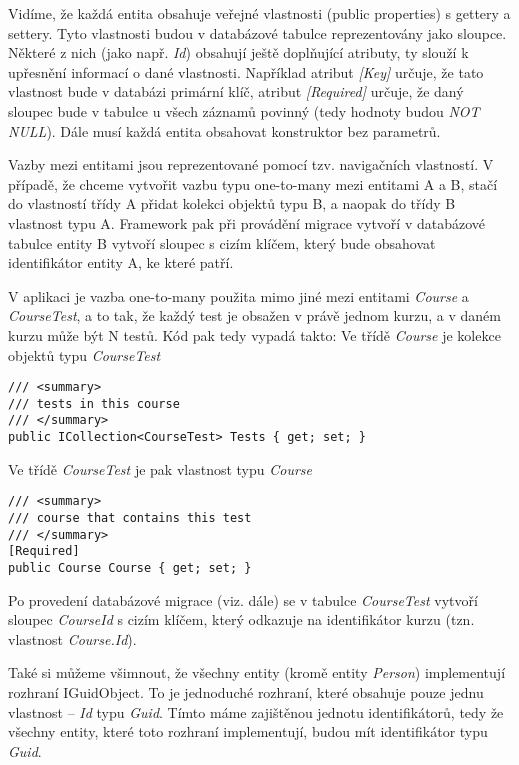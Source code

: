 Vidíme, že každá entita obsahuje veřejné vlastnosti (public properties) s gettery a settery. Tyto vlastnosti budou v databázové tabulce reprezentovány jako sloupce. Některé z nich (jako např. \textit{Id}) obsahují ještě doplňující atributy, ty slouží k upřesnění informací o dané vlastnosti. Například atribut \textit{[Key]} určuje, že tato vlastnost bude v databázi primární klíč, atribut \textit{[Required]} určuje, že daný sloupec bude v tabulce u všech záznamů povinný (tedy hodnoty budou \textit{NOT NULL}).
Dále musí každá entita obsahovat konstruktor bez parametrů.

Vazby mezi entitami jsou reprezentované pomocí tzv. navigačních vlastností. V případě, že chceme vytvořit vazbu typu one-to-many mezi entitami A a B, stačí do vlastností třídy A přidat kolekci objektů typu B, a naopak do třídy B vlastnost typu A. Framework pak při provádění migrace vytvoří v databázové tabulce entity B vytvoří sloupec s cizím klíčem, který bude obsahovat identifikátor entity A, ke které patří.

V aplikaci je vazba one-to-many použita mimo jiné mezi entitami \textit{Course} a \textit{CourseTest}, a to tak, že každý test je obsažen v právě jednom kurzu, a v daném kurzu může být N testů.
Kód pak tedy vypadá takto: Ve třídě \textit{Course} je kolekce objektů typu \textit{CourseTest}

\begin{lstlisting}
/// <summary>
/// tests in this course
/// </summary>
public ICollection<CourseTest> Tests { get; set; }
\end{lstlisting}

Ve třídě \textit{CourseTest} je pak vlastnost typu \textit{Course}

\begin{lstlisting}
/// <summary>
/// course that contains this test
/// </summary>
[Required]
public Course Course { get; set; }
\end{lstlisting}

Po provedení databázové migrace (viz. dále) se v tabulce \textit{CourseTest} vytvoří sloupec \textit{CourseId} s cizím klíčem, který odkazuje na identifikátor kurzu (tzn. vlastnost \textit{Course.Id}).

Také si můžeme všimnout, že všechny entity (kromě entity \textit{Person}) implementují rozhraní IGuidObject. To je jednoduché rozhraní, které obsahuje pouze jednu vlastnost -- \textit{Id} typu \textit{Guid}. Tímto máme zajištěnou jednotu identifikátorů, tedy že všechny entity, které toto rozhraní implementují, budou mít identifikátor typu \textit{Guid}.

